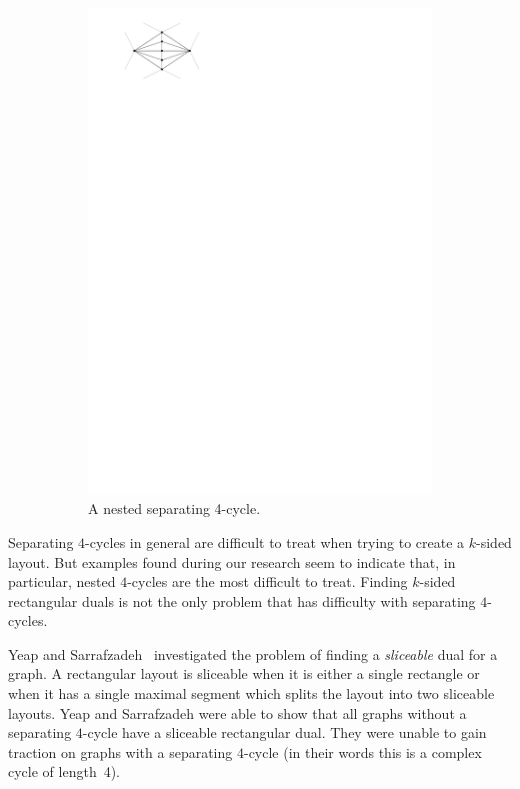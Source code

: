 \begin{figure}
\begin{subfigure}[t]{2cm}
          \includegraphics[width =\textwidth]{introduction/img/nest4cycle.pdf}
          \caption{A nested separating 4-cycle.}
      \end{subfigure}
    \caption{}
    \label{fig:intro:4cycle}
  \end{figure}


  Separating $4$-cycles in general are difficult to treat when trying to create a $k$-sided layout.
  But examples found during our research seem to indicate that, in particular, nested $4$-cycles are the most difficult to treat.
  Finding $k$-sided rectangular duals is not the only problem that has difficulty with separating $4$-cycles.

  Yeap and Sarrafzadeh~\cite{Yeap1995} investigated the problem of finding a \emph{sliceable} dual for a graph. A rectangular layout is sliceable when it is either a single rectangle or when it has a single maximal segment which splits the layout into two sliceable layouts.
  Yeap and Sarrafzadeh were able to show that all graphs without a separating $4$-cycle have a sliceable rectangular dual.
  They were unable to gain traction on graphs with a separating $4$-cycle (in their words this is a complex cycle of length~4).

